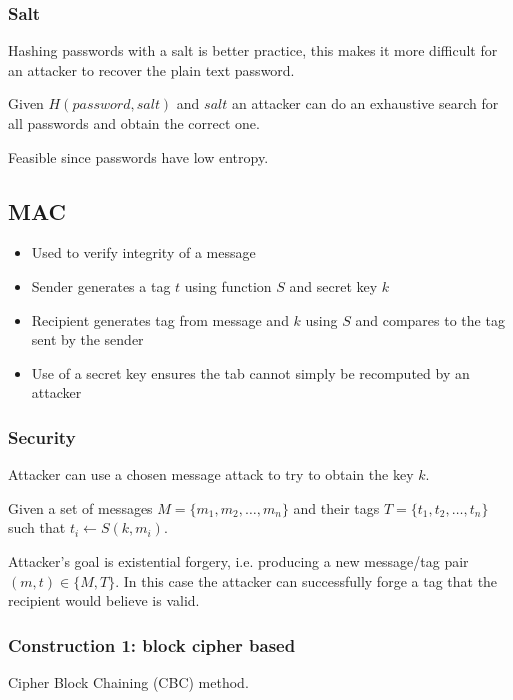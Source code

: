 \documentclass[a4paper]{article}
\begin{document}
\subsubsection{Salt}

Hashing passwords with a salt is better practice, this makes it more difficult
for an attacker to recover the plain text password.


Given $H(password, salt)$ and $salt$ an attacker can do an exhaustive search for
all passwords and obtain the correct one.

Feasible since passwords have low entropy.

\subsection{MAC}

\begin{itemize}
  \item Used to verify integrity of a message
  \item Sender generates a tag $t$ using function $S$ and secret key $k$
  \item Recipient generates tag from message and $k$ using $S$ and compares to
        the tag sent by the sender
  \item Use of a secret key ensures the tab cannot simply be recomputed by an
        attacker
\end{itemize}

\subsubsection{Security}

Attacker can use a chosen message attack to try to obtain the key $k$.

Given a set of messages $M = \{m_{1}, m_{2}, \ldots, m_{n}\}$ and their tags $T
= \{t_{1}, t_{2}, \ldots, t_{n}\}$ such that $t_{i} \leftarrow S(k, m_{i})$.

Attacker's goal is existential forgery, i.e. producing a new message/tag pair
$(m, t) \in \{M, T\}$. In this case the attacker can successfully forge a tag
that the recipient would believe is valid.

\subsubsection{Construction 1: block cipher based}

Cipher Block Chaining (CBC) method.
\end{document}
